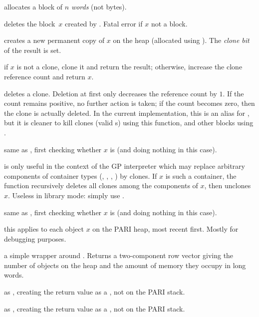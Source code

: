 
 allocates a block of $n$ \emph{words} (not bytes).

 deletes the block~$x$ created by .
Fatal error if $x$ not a block.

 creates a new permanent copy of $x$ on the heap
(allocated using ). The \emph{clone bit} of the result is set.

 if $x$ is not a clone, clone it and return the
result; otherwise, increase the clone reference count and return $x$.

 deletes a clone. Deletion at first only decreases
the reference count by $1$. If the count remains positive, no further action is
taken; if the count becomes zero, then the clone is actually deleted. In the
current implementation, this is an alias for , but it is cleaner
to kill clones (valid s) using this function, and other blocks using
.

 same as , first checking
whether $x$ is  (and doing nothing in this case).

 is only useful in the context of the GP
interpreter which may replace arbitrary components of container types
(, , , ) by clones. If $x$ is such
a container, the function recursively deletes all clones among the components
of $x$, then unclones $x$. Useless in library mode: simply use
.

 same as , first
checking whether $x$ is  (and doing nothing in this case).

 this applies
 to each object $x$ on the PARI heap, most recent
first. Mostly for debugging purposes.

 a simple wrapper around . Returns  a
two-component row vector giving the number of objects on the heap and the
amount of memory they occupy in long words.

 as , creating the return
value as a , not on the PARI stack.

 as , creating the return
value as a , not on the PARI stack.

